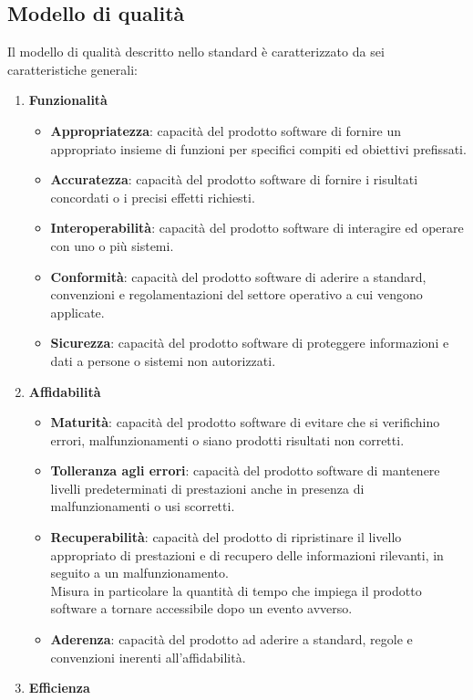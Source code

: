 \subsection{Modello di qualità}
Il modello di qualità descritto nello standard è caratterizzato da sei
caratteristiche generali:
\begin{enumerate}
	\item \textbf{Funzionalità}
	\begin{itemize}
		\item \textbf{Appropriatezza}: capacità del prodotto software di fornire un appropriato insieme
		di funzioni per specifici compiti ed obiettivi prefissati.
		\item \textbf{Accuratezza}: capacità del prodotto software di fornire i risultati 
		concordati o i precisi effetti richiesti.
		\item \textbf{Interoperabilità}: capacità del prodotto software di interagire ed operare con 
		uno o più sistemi.
		\item \textbf{Conformità}: capacità del prodotto software di aderire a standard, convenzioni e 
		regolamentazioni del settore operativo a cui vengono applicate.
		\item \textbf{Sicurezza}: capacità del prodotto software di proteggere informazioni e dati
		a persone o sistemi non autorizzati.
	\end{itemize}
	\item \textbf{Affidabilità}
	\begin{itemize}
		\item \textbf{Maturità}: capacità del prodotto software di evitare che si verifichino errori, 
		malfunzionamenti o siano prodotti risultati non corretti.
		\item \textbf{Tolleranza agli errori}: capacità del prodotto software di mantenere livelli predeterminati di prestazioni
		anche in presenza di malfunzionamenti o usi scorretti.
		\item \textbf{Recuperabilità}: capacità del prodotto di ripristinare il livello appropriato di prestazioni e di recupero 
		delle informazioni rilevanti, in seguito a un malfunzionamento.\\ Misura in particolare la quantità di tempo che impiega il
		prodotto software a tornare accessibile dopo un evento avverso.
		\item \textbf{Aderenza}: capacità del prodotto ad aderire a standard, regole e convenzioni inerenti all'affidabilità.
	\end{itemize}
	\item \textbf{Efficienza}

\end{enumerate}

